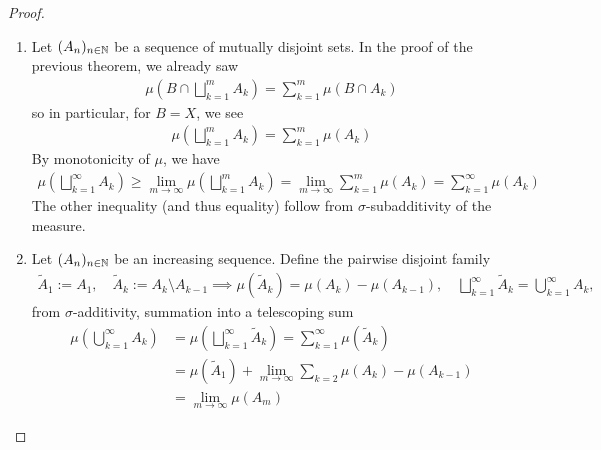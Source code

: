 \begin{proof}
  \begin{enumerate}
    \item Let $(A_n)_{n \in \mathbb{N}}$ be a sequence of mutually disjoint sets.
      In the proof of the previous theorem, we already saw
      \begin{align*}
        \mu \left(
          B \cap \bigsqcup_{k=1}^{m}A_k
        \right)
        = \sum_{k=1}^{m}\mu(B \cap A_k)
      \end{align*}
      so in particular, for $B = X$, we see
      \begin{align*}
        \mu \left(
          \bigsqcup_{k=1}^{m}A_k
        \right)
        = \sum_{k=1}^{m} \mu(A_k)
      \end{align*}
      By monotonicity of $\mu$, we have
      \begin{align*}
        \mu \left(
          \bigsqcup_{k=1}^{\infty}A_k
        \right)
        \geq \lim_{m \to \infty} \mu\left(
          \bigsqcup_{k=1}^{m}A_k
        \right)
        =
        \lim_{m \to \infty} \sum_{k=1}^{m}\mu(A_k)
        =
        \sum_{k=1}^{\infty}\mu(A_k)
      \end{align*}
      The other inequality (and thus equality) follow from $\sigma$-subadditivity of the measure.

    \item Let $(A_n)_{n \in \mathbb{N}}$ be an increasing sequence. 
      Define the pairwise disjoint family
      \begin{align*}
        \tilde{A}_1 := A_1, \quad \tilde{A}_k := A_k \setminus A_{k-1} \implies \mu(\tilde{A}_k) = \mu(A_k) - \mu(A_{k-1}), \quad \bigsqcup_{k=1}^{\infty} \tilde{A}_k = \bigcup_{k=1}^{\infty}A_k, 
      \end{align*}
      from $\sigma$-additivity, summation into a telescoping sum 
      \begin{align*}
        \mu \left(
          \bigcup_{k=1}^{\infty}A_k
        \right)
        &=
        \mu \left(
          \bigsqcup_{k=1}^{\infty}\tilde{A}_k
        \right)
        =
        \sum_{k=1}^{\infty}\mu(\tilde{A}_k)
        \\
        &=
        \mu(\tilde{A}_1) + \lim_{m \to \infty} \sum_{k=2}\mu(A_k) - \mu(A_{k-1})
        \\
        &=
        \lim_{m \to \infty} \mu(A_m)
      \end{align*}


\end{enumerate}
\end{proof}
